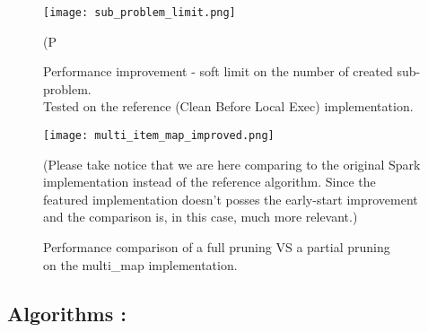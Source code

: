 \documentclass{eplmastersthesis}
\begin{document}
\begin{figure}[h]
  \centering
  \texttt{[image: sub\_problem\_limit.png]}
  \caption[Performance improvement - soft limit on the number of created sub-problem.]{
  		Performance improvement - soft limit on the number of created sub-problem. \\ 
  		Tested on the reference (Clean Before Local Exec) implementation.
  	\endtabular
  }
  (P
  \label{fig:sub_problem_limit}
\end{figure}

\begin{figure}[h]
  \centering
  \texttt{[image: multi\_item\_map\_improved.png]}
  \caption[PPIC with a map structure]{
  		Performance comparison of a full pruning VS a partial pruning \\ 
  		on the \textrm{multi\_map} implementation.
  	\endtabular
  }
  (Please take notice that we are here comparing to the original Spark implementation instead of the reference algorithm. Since the featured implementation doesn't posses the early-start improvement and the comparison is, in this case, much more relevant.)
  \label{fig:multi_map_comp}
\end{figure}

\clearpage
\subsection{Algorithms :}
\end{document}
